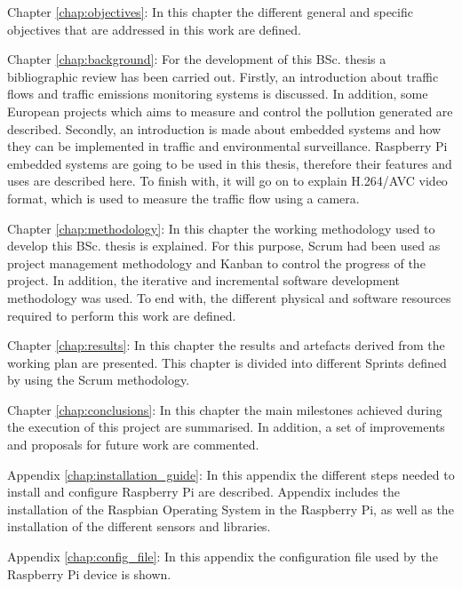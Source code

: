 \begin{definitionlist}
	\item[Chapter \ref{chap:objectives}: \nameref{chap:objectives}] In this chapter the different general and specific objectives that are addressed in this work are defined.
	
	\item[Chapter \ref{chap:background}: \nameref{chap:background}] For the development of this \ac{BSc.} thesis a bibliographic review has been carried out. Firstly, an introduction about traffic flows and traffic emissions monitoring systems is discussed. In addition, some European projects which aims to measure and control the pollution generated are described. Secondly, an introduction is made about embedded systems and how they can be implemented in traffic and environmental surveillance. Raspberry Pi embedded systems are going to be used in this thesis, therefore their features and uses are described here. To finish with, it will go on to explain H.264/AVC video format, which is used to measure the traffic flow using a camera.
	
	\item[Chapter \ref{chap:methodology}: \nameref{chap:methodology}] In this chapter the working methodology used to develop this \ac{BSc.} thesis is explained. For this purpose, Scrum had been used as project management methodology and Kanban to control the progress of the project. In addition, the iterative and incremental software development methodology was used. To end with, the different physical and software resources required to perform this work are defined.
	
	\item[Chapter \ref{chap:results}: \nameref{chap:results}] In this chapter the results and artefacts derived from the working plan are presented. This chapter is divided into different Sprints defined by using the Scrum methodology.
	
	\item[Chapter \ref{chap:conclusions}: \nameref{chap:conclusions}] In this chapter the main milestones achieved during the execution of this project are summarised. In addition, a set of improvements and proposals for future work are commented. 
	
	\item[Appendix \ref{chap:installation_guide}: \nameref{chap:installation_guide}] In this appendix the different steps needed to install and configure Raspberry Pi are described.  Appendix  includes the installation of the Raspbian Operating System in the Raspberry Pi, as well as the installation of the different sensors and libraries.
	
	\item[Appendix \ref{chap:config_file}: \nameref{chap:config_file}] In this appendix the configuration file used by the Raspberry Pi device is shown.
\end{definitionlist}



